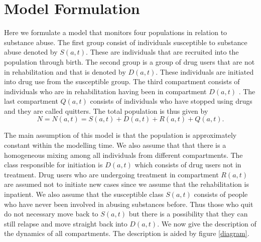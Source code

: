 \section{Model Formulation}
Here we formulate a model that monitors four populations in relation to substance abuse. The first group consist of individuals  susceptible to substance abuse denoted by $S(a,t)$. These are individuals that are recruited into the population through birth. The second group is a group of drug users that are not in rehabilitation and that is denoted by $D(a,t)$. These individuals are initiated into drug use from the susceptible group. The  third compartment consists of individuals who are in rehabilitation having been in compartment $D(a,t)$ . The last compartment $Q(a,t)$ consists of individuals who have stopped using drugs and they are called  quitters. The total population is thus given by \[N=N(a,t)=S(a,t)+D(a,t)+R(a,t)+Q(a,t).\]

The main assumption of this model is that the population is approximately constant within the modelling time. We also assume that that there is a homogeneous mixing among all individuals from different compartments. The class responsible for initiation is $D(a,t)$ which consists of drug users not in treatment. Drug users who are undergoing treatment in compartment $R(a,t)$ are assumed not to initiate new cases  since we assume that the rehabilitation is inpatient. We also assume that the susceptible class $S(a,t)$ consists of people who have never been involved in abusing substances before. Thus those who quit do not necessary move back to $S(a,t)$ but there is a possibility that they can still relapse and move straight back into $D(a,t)$. We now give the description of the dynamics of all compartments. The description is aided by  figure \ref{diagram}.

